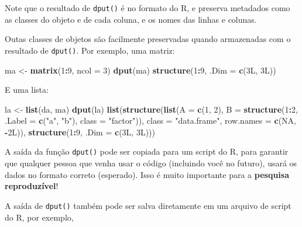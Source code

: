 \documentclass[10pt,a4paper]{book}
\newenvironment{Shaded}{\begin{snugshade}}{\end{snugshade}}
\newcommand{\KeywordTok}[1]{\textcolor[rgb]{0.13,0.29,0.53}{\textbf{#1}}}
\newcommand{\DataTypeTok}[1]{\textcolor[rgb]{0.13,0.29,0.53}{#1}}
\newcommand{\DecValTok}[1]{\textcolor[rgb]{0.00,0.00,0.81}{#1}}
\newcommand{\StringTok}[1]{\textcolor[rgb]{0.31,0.60,0.02}{#1}}
\newcommand{\OtherTok}[1]{\textcolor[rgb]{0.56,0.35,0.01}{#1}}
\newcommand{\OperatorTok}[1]{\textcolor[rgb]{0.81,0.36,0.00}{\textbf{#1}}}
\newcommand{\NormalTok}[1]{#1}
\begin{document}
Note que o resultado de \texttt{dput()} é no formato do R, e preserva
metadados como as classes do objeto e de cada coluna, e os nomes das
linhas e colunas.

Outas classes de objetos são facilmente preservadas quando armazenadas
com o resultado de \texttt{dput()}. Por exemplo, uma matriz:

\begin{Shaded}
\begin{Highlighting}[]
\NormalTok{ma <-}\StringTok{ }\KeywordTok{matrix}\NormalTok{(}\DecValTok{1}\OperatorTok{:}\DecValTok{9}\NormalTok{, }\DataTypeTok{ncol =} \DecValTok{3}\NormalTok{)}
\KeywordTok{dput}\NormalTok{(ma)}
\KeywordTok{structure}\NormalTok{(}\DecValTok{1}\OperatorTok{:}\DecValTok{9}\NormalTok{, }\DataTypeTok{.Dim =} \KeywordTok{c}\NormalTok{(3L, 3L))}
\end{Highlighting}
\end{Shaded}

E uma lista:

\begin{Shaded}
\begin{Highlighting}[]
\NormalTok{la <-}\StringTok{ }\KeywordTok{list}\NormalTok{(da, ma)}
\KeywordTok{dput}\NormalTok{(la)}
\KeywordTok{list}\NormalTok{(}\KeywordTok{structure}\NormalTok{(}\KeywordTok{list}\NormalTok{(}\DataTypeTok{A =} \KeywordTok{c}\NormalTok{(}\DecValTok{1}\NormalTok{, }\DecValTok{2}\NormalTok{), }\DataTypeTok{B =} \KeywordTok{structure}\NormalTok{(}\DecValTok{1}\OperatorTok{:}\DecValTok{2}\NormalTok{, }\DataTypeTok{.Label =} \KeywordTok{c}\NormalTok{(}\StringTok{"a"}\NormalTok{, }
\StringTok{"b"}\NormalTok{), }\DataTypeTok{class =} \StringTok{"factor"}\NormalTok{)), }\DataTypeTok{class =} \StringTok{"data.frame"}\NormalTok{, }\DataTypeTok{row.names =} \KeywordTok{c}\NormalTok{(}\OtherTok{NA}\NormalTok{, }
\OperatorTok{-}\NormalTok{2L)), }\KeywordTok{structure}\NormalTok{(}\DecValTok{1}\OperatorTok{:}\DecValTok{9}\NormalTok{, }\DataTypeTok{.Dim =} \KeywordTok{c}\NormalTok{(3L, 3L)))}
\end{Highlighting}
\end{Shaded}

A saída da função \texttt{dput()} pode ser copiada para um script do R,
para garantir que qualquer pessoa que venha usar o código (incluindo
você no futuro), usará os dados no formato correto (esperado). Isso é
muito importante para a \textbf{pesquisa reproduzível}!

A saída de \texttt{dput()} também pode ser salva diretamente em um
arquivo de script do R, por exemplo,
\end{document}

